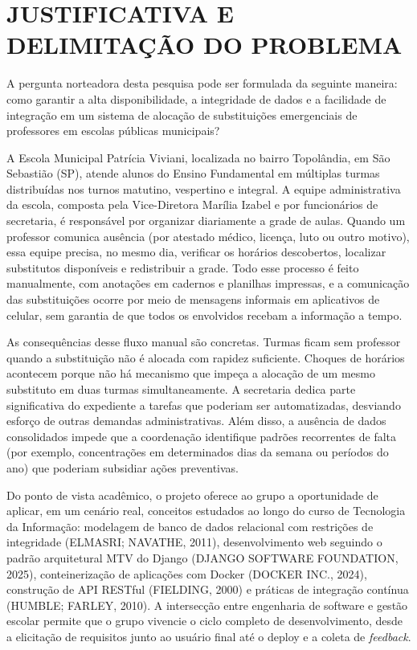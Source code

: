 \section[Justificativa e delimitação do problema]{JUSTIFICATIVA E DELIMITAÇÃO DO PROBLEMA}

A pergunta norteadora desta pesquisa pode ser formulada da seguinte maneira: como garantir a alta disponibilidade, a integridade de dados e a facilidade de integração em um sistema de alocação de substituições emergenciais de professores em escolas públicas municipais?

A Escola Municipal Patrícia Viviani, localizada no bairro Topolândia, em São Sebastião (SP), atende alunos do Ensino Fundamental em múltiplas turmas distribuídas nos turnos matutino, vespertino e integral. A equipe administrativa da escola, composta pela Vice-Diretora Marília Izabel e por funcionários de secretaria, é responsável por organizar diariamente a grade de aulas. Quando um professor comunica ausência (por atestado médico, licença, luto ou outro motivo), essa equipe precisa, no mesmo dia, verificar os horários descobertos, localizar substitutos disponíveis e redistribuir a grade. Todo esse processo é feito manualmente, com anotações em cadernos e planilhas impressas, e a comunicação das substituições ocorre por meio de mensagens informais em aplicativos de celular, sem garantia de que todos os envolvidos recebam a informação a tempo.

As consequências desse fluxo manual são concretas. Turmas ficam sem professor quando a substituição não é alocada com rapidez suficiente. Choques de horários acontecem porque não há mecanismo que impeça a alocação de um mesmo substituto em duas turmas simultaneamente. A secretaria dedica parte significativa do expediente a tarefas que poderiam ser automatizadas, desviando esforço de outras demandas administrativas. Além disso, a ausência de dados consolidados impede que a coordenação identifique padrões recorrentes de falta (por exemplo, concentrações em determinados dias da semana ou períodos do ano) que poderiam subsidiar ações preventivas.

Do ponto de vista acadêmico, o projeto oferece ao grupo a oportunidade de aplicar, em um cenário real, conceitos estudados ao longo do curso de Tecnologia da Informação: modelagem de banco de dados relacional com restrições de integridade (ELMASRI; NAVATHE, 2011), desenvolvimento web seguindo o padrão arquitetural MTV do Django (DJANGO SOFTWARE FOUNDATION, 2025), conteinerização de aplicações com Docker (DOCKER INC., 2024), construção de API RESTful (FIELDING, 2000) e práticas de integração contínua (HUMBLE; FARLEY, 2010). A intersecção entre engenharia de software e gestão escolar permite que o grupo vivencie o ciclo completo de desenvolvimento, desde a elicitação de requisitos junto ao usuário final até o deploy e a coleta de \textit{feedback}.

